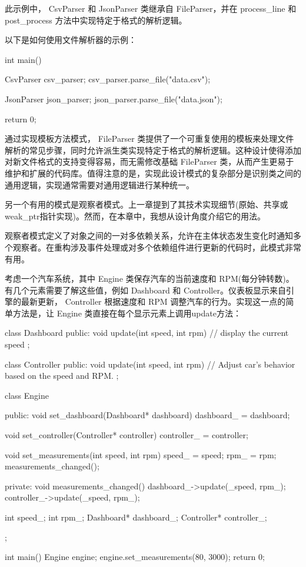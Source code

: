 此示例中， CsvParser 和 JsonParser 类继承自 FileParser，并在 process\_line 和 post\_process 方法中实现特定于格式的解析逻辑。

以下是如何使用文件解析器的示例：

\begin{cpp}
int main() {
    CsvParser csv_parser;
    csv_parser.parse_file("data.csv");

    JsonParser json_parser;
    json_parser.parse_file("data.json");

    return 0;
}
\end{cpp}

通过实现模板方法模式， FileParser 类提供了一个可重复使用的模板来处理文件解析的常见步骤，同时允许派生类实现特定于格式的解析逻辑。这种设计使得添加对新文件格式的支持变得容易，而无需修改基础 FileParser 类，从而产生更易于维护和扩展的代码库。值得注意的是，实现此设计模式的复杂部分是识别类之间的通用逻辑，实现通常需要对通用逻辑进行某种统一。

另一个有用的模式是观察者模式。上一章提到了其技术实现细节(原始、共享或weak\_ptr指针实现)。然而，在本章中，我想从设计角度介绍它的用法。

观察者模式定义了对象之间的一对多依赖关系，允许在主体状态发生变化时通知多个观察者。在重构涉及事件处理或对多个依赖组件进行更新的代码时，此模式非常有用。

考虑一个汽车系统，其中 Engine 类保存汽车的当前速度和 RPM(每分钟转数)。有几个元素需要了解这些值，例如 Dashboard 和 Controller。仪表板显示来自引擎的最新更新， Controller 根据速度和 RPM 调整汽车的行为。实现这一点的简单方法是，让 Engine 类直接在每个显示元素上调用update方法：

\begin{cpp}
class Dashboard {
public:
    void update(int speed, int rpm) {
        // display the current speed
    }
};

class Controller {
public:
    void update(int speed, int rpm) {
        // Adjust car's behavior based on the speed and RPM.
    }
};

class Engine {
public:
    void set_dashboard(Dashboard* dashboard) {
        dashboard_ = dashboard;
    }

    void set_controller(Controller* controller) {
        controller_ = controller;
    }

    void set_measurements(int speed, int rpm) {
        speed_ = speed;
        rpm_ = rpm;
        measurements_changed();
    }

private:
    void measurements_changed() {
        dashboard_->update(_speed, rpm_);
        controller_->update(_speed, rpm_);
    }

    int speed_;
    int rpm_;
    Dashboard* dashboard_;
    Controller* controller_;
};

int main() {
    Engine engine;
    engine.set_measurements(80, 3000);
    return 0;
}
\end{cpp}

